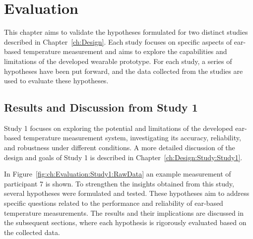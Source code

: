 \chapter{Evaluation}
\label{ch:Evaluation}
This chapter aims to validate the hypotheses formulated for two distinct studies described in Chapter~\ref{ch:Design}. 
Each study focuses on specific aspects of ear-based temperature measurement and aims to explore the capabilities and limitations of the developed wearable prototype. 
For each study, a series of hypotheses have been put forward, and the data collected from the studies are used to evaluate these hypotheses.

\section{Results and Discussion from Study 1}
\label{sec:Evaluation:Study1}
Study 1 focuses on exploring the potential and limitations of the developed ear-based temperature measurement system, investigating its accuracy, reliability, and robustness under different conditions. 
A more detailed discussion of the design and goals of Study 1 is described in Chapter~\ref{ch:Design:Study:Study1}.

In Figure~\ref{fig:ch:Evaluation:Study1:RawData} an example measurement of participant 7 is shown.
To strengthen the insights obtained from this study, several hypotheses were formulated and tested. 
These hypotheses aim to address specific questions related to the performance and reliability of ear-based temperature measurements. 
The results and their implications are discussed in the subsequent sections, where each hypothesis is rigorously evaluated based on the collected data.

